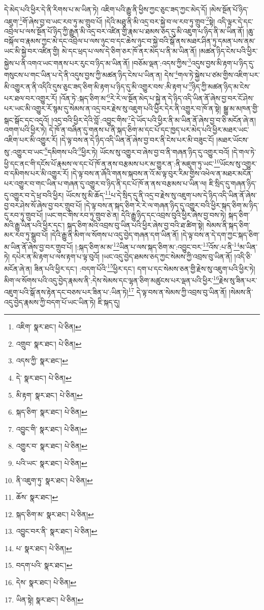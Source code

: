 དེ་མེད་པའི་ཕྱིར་དེ་ནི་རིགས་པ་མ་ཡིན་ཏེ། འཇིག་པའི་རྒྱུ་ནི་ཕྱིས་ཀྱང་ཅུང་ཟད་ཀྱང་མེད་དོ། །མེས་སྔོན་པོ་ཉིད་འཇུག་\footnote{འཇིག་  སྣར་ཐང་།  པེ་ཅིན། }གོ་ཞེས་བྱ་བ་ཡང་རབ་ཏུ་མ་གྲུབ་པོ། །དེའི་མཐུ་ནི་མི་འདྲ་བར་སྐྱེ་བ་ལ་རབ་ཏུ་གྲུབ་\footnote{འགྲུབ་  སྣར་ཐང་།  པེ་ཅིན། }སྟེ། འདི་ལྟར་དེ་དང་འབྲེལ་པ་ལས་སྔོན་པོ་ཉིད་ཀྱི་རྒྱུན་མི་འདྲ་བར་འཛིན་གྱི་རྣམ་པ་ཐམས་ཅད་དུ་མི་འཇུག་པ་ཉིད་ནི་མ་ཡིན་ནོ། །ཆུ་བསྐོལ་བ་རྣམས་ཀྱང་མེ་དང་འབྲེལ་པ་ལས་ཉུང་བ་དང་ཆེས་ཉུང་བ་སྐྱེ་བའི་སྒོ་ནས་མཐར་ཤིན་ཏུ་དམན་པས་ནམ་ཡང་མི་སྐྱེ་བར་འཛིན་གྱི། མེ་དང་ཕྲད་པ་ལས་དེ་ཅིག་ཅར་ཁོ་ནར་མེད་པ་ནི་མ་ཡིན་ནོ། །མཚན་ཉིད་ངེས་པའི་ཕྱིར་སྐྱེས་པ་ནི་འགའ་ཡང་གནས་པར་རུང་བ་ཉིད་མ་ཡིན་ནོ། །བཅོམ་ལྡན་:འདས་ཀྱིས་\footnote{འདས་ཀྱི་  སྣར་ཐང་། }འདུས་བྱས་མི་རྟག་པ་ཉིད་དུ་གསུངས་པ་གང་ཡིན་པ་དེ་ནི་འདུས་བྱས་ཀྱི་མཚན་ཉིད་ངེས་པ་ཡིན་ན། དེས་\footnote{དེ་  སྣར་ཐང་།  པེ་ཅིན། }གལ་ཏེ་སྐྱེས་པ་ཙམ་གྱིས་འཇིག་པར་མི་འགྱུར་ན་ནི་འདིའི་དུས་ཅུང་ཟད་ཅིག་མི་རྟག་པ་ཉིད་དུ་མི་འགྱུར་བས་:མི་རྟག་པ་\footnote{མི་རྟག་  སྣར་ཐང་།  པེ་ཅིན། }ཉིད་ཀྱི་མཚན་ཉིད་མ་ངེས་པར་ཐལ་བར་འགྱུར་རོ། །འོན་ཏེ་:སྐད་ཅིག་མ་\footnote{སྐད་ཅིག་  སྣར་ཐང་།  པེ་ཅིན། }རེ་རེ་ལ་སྔོན་མེད་པ་སྐྱེ་ན་དེ་ཉིད་འདི་ཡིན་ནོ་ཞེས་བྱ་བར་ངོ་ཤེས་པར་ཡང་མི་འགྱུར་རོ་སྙམ་དུ་སེམས་ན་འདྲ་བར་རྗེས་སུ་འཇུག་པའི་ཕྱིར་དེར་ནི་འགྱུར་བ་ཁོ་ན་སྟེ། སྒྱུ་མ་མཁན་གྱི་སྒང་སྒོང་དང་འདྲའོ། །འདྲ་བའི་ཕྱིར་དེའི་བློ་:འབྱུང་གིས་\footnote{འབྱུང་གི་  སྣར་ཐང་།  པེ་ཅིན། }དེ་ཡོད་པའི་ཕྱིར་ནི་མ་ཡིན་ནོ་ཞེས་བྱ་བ་ཅི་མངོན་ཞེ་ན། འགག་པའི་ཕྱིར་ཏེ། དེ་ཁོ་ན་བཞིན་དུ་གནས་པ་ནི་སྐད་ཅིག་མ་དང་པོ་དང་ཁྱད་པར་མེད་པའི་ཕྱིར་མཐར་ཡང་འཇིག་པར་མི་འགྱུར་རོ། །དེ་ལྟ་བས་ན་དེ་ཉིད་འདི་ཡིན་ནོ་ཞེས་བྱ་བར་ནི་ངེས་པར་མི་བཟུང་ངོ། །མཐར་ཡོངས་སུ་:འགྱུར་བ་ཡང་\footnote{འགྱུར་བ་  སྣར་ཐང་།  པེ་ཅིན། }དམིགས་པའི་\footnote{པའི་ཡང་  སྣར་ཐང་།  པེ་ཅིན། }ཕྱིར་ཏེ། ཡོངས་སུ་འགྱུར་བ་ཞེས་བྱ་བ་ནི་གཞན་ཉིད་དུ་འགྱུར་བའོ། །དེ་གལ་ཏེ་ཕྱི་དང་ནང་གི་དངོས་པོ་རྣམས་ལ་དང་པོ་ཁོ་ན་ནས་བརྩམས་པར་མ་གྱུར་ན་:ནི་མཇུག་ཏུ་ཡང་\footnote{ནི་འཇུག་ཏུ་  སྣར་ཐང་།  པེ་ཅིན། }ཡོངས་སུ་འགྱུར་བ་དམིགས་པར་མི་འགྱུར་རོ། །དེ་ལྟ་བས་ན་ཞོའི་གནས་སྐབས་ན་འོ་མ་ལྟ་བུར་རིམ་གྱིས་འཕེལ་ན་མཐར་མངོན་པར་འགྱུར་བ་གང་ཡིན་པ་གཞན་དུ་འགྱུར་བ་ཉིད་ནི་དང་པོ་ཁོ་ན་ནས་བརྩམས་པ་ཡིན་ལ། ཇི་སྲིད་དུ་གཞན་ཉིད་དུ་འགྱུར་བ་དེ་ཕྲ་བའི་ཕྱིར། ཡོངས་སུ་མི་ཆོད་\footnote{ཆོས་  སྣར་ཐང་། }པ་དེ་སྲིད་དུ་ནི་འདྲ་བ་རྗེས་སུ་འཇུག་པས་དེ་ཉིད་འདི་ཡིན་ནོ་ཞེས་བྱ་བར་ཤེས་སོ་ཞེས་བྱ་བར་གྲུབ་པོ། །དེ་ལྟ་བས་ན་སྐད་ཅིག་རེ་རེ་ལ་གཞན་ཉིད་དུ་འགྱུར་བའི་ཕྱིར་སྐད་ཅིག་མ་ཉིད་དུ་རབ་ཏུ་གྲུབ་པོ། །ཡང་གང་གིས་རབ་ཏུ་གྲུབ་ཅེ་ན། དེའི་རྒྱུ་ཉིད་དང་འབྲས་བུའི་ཕྱིར་ཞེས་བྱ་བས་ཏེ། སྐད་ཅིག་མའི་རྒྱུ་ཡིན་པའི་ཕྱིར་དང་། སྐད་ཅིག་མའི་འབྲས་བུ་ཡིན་པའི་ཕྱིར་ཞེས་བྱ་བའི་ཐ་ཚིག་སྟེ། སེམས་ནི་སྐད་ཅིག་མར་རབ་ཏུ་སྒྲུབ་པོ། །དེའི་རྒྱུ་ནི་མིག་ལ་སོགས་པ་འདུ་བྱེད་གཞན་དག་ཡིན་ནོ། །དེ་ལྟ་བས་ན་དེ་དག་ཀྱང་སྐད་ཅིག་མ་ཡིན་ནོ་ཞེས་བྱ་བར་གྲུབ་པོ། །:སྐད་ཅིག་མ་མ་\footnote{སྐད་ཅིག་མ་  སྣར་ཐང་།  པེ་ཅིན། }ཡིན་པ་ལས་སྐད་ཅིག་མ་:འབྱུང་བར་\footnote{འབྱུང་བར་ནི་  སྣར་ཐང་།  པེ་ཅིན། }འོས་:པ་ནི་\footnote{པ་  སྣར་ཐང་།  པེ་ཅིན། }མ་ཡིན་ཏེ། དཔེར་ན་མི་རྟག་པ་ལས་རྟག་པ་ལྟ་བུའོ། །ཡང་འདུ་བྱེད་ཐམས་ཅད་ཀྱང་སེམས་ཀྱི་འབྲས་བུ་ཡིན་ནོ། །འདི་ཅི་མངོན་ཞེ་ན། ཟིན་པའི་ཕྱིར་དང་། :བདག་པོའི་\footnote{བདག་པའི་  སྣར་ཐང་། }ཕྱིར་དང་། དག་པ་དང་སེམས་ཅན་གྱི་རྗེས་སུ་འཇུག་པའི་ཕྱིར་ཏེ། མིག་ལ་སོགས་པའི་འདུ་བྱེད་རྣམས་ནི་:དེས་སེམས་དང་ལྷན་ཅིག་མཚུངས་པར་ལྡན་པའི་ཕྱིར་\footnote{དེས་  སྣར་ཐང་།  པེ་ཅིན། }རྗེས་སུ་ཟིན་པར་འཇུག་པའི་སྒོ་ནས་རྟེན་དང་བཅས་པར་ཟིན་པ་:ཡིན་ཏེ།\footnote{ཡིན་སྟེ།  སྣར་ཐང་།  པེ་ཅིན། } དེ་ལྟ་བས་ན་སེམས་ཀྱི་འབྲས་བུ་ཡིན་ནོ། །སེམས་ནི་འདུ་བྱེད་རྣམས་ཀྱི་བདག་པོ་ཡང་ཡིན་ཏེ། ཇི་སྐད་དུ། 